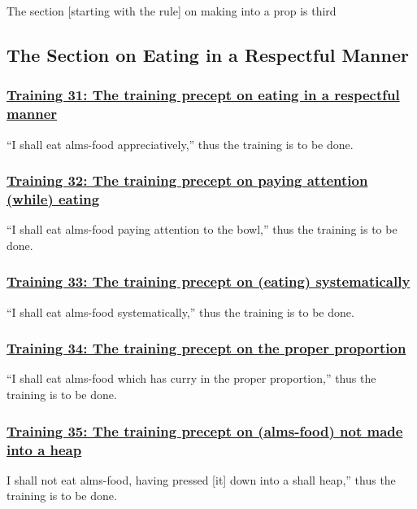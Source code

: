 \begin{center}
  The section [starting with the rule] on making into a prop is third
\end{center}

\setsubsecheadstyle{\subsectionFmt}
\subsection{The Section on Eating in a Respectful Manner}
\vspace{0.2cm}

\subsubsection*{\hyperref[sekh31]{Training 31: The training precept on eating in a respectful manner}}
\label{training31}
``I shall eat alms-food appreciatively,'' thus the training is to be done.

\subsubsection*{\hyperref[sekh32]{Training 32: The training precept on paying attention (while) eating}}
\label{training32}
``I shall eat alms-food paying attention to the bowl,'' thus the training is to be done.

\subsubsection*{\hyperref[sekh33]{Training 33: The training precept on (eating) systematically}}
\label{training33}
``I shall eat alms-food systematically,'' thus the training is to be done.

\subsubsection*{\hyperref[sekh34]{Training 34: The training precept on the proper proportion}}
\label{training34}
``I shall eat alms-food which has curry in the proper proportion,'' thus the training is to be done.

\subsubsection*{\hyperref[sekh35]{Training 35: The training precept on (alms-food) not made into a heap}}
\label{training35}
I shall not eat alms-food, having pressed [it] down into a shall heap,'' thus the training is to be done.

